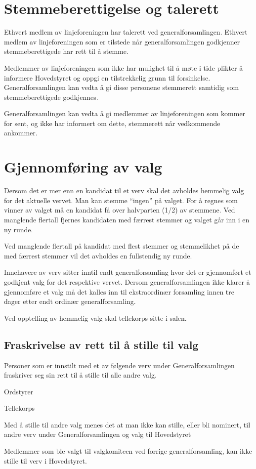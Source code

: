 \section{Stemmeberettigelse og talerett}
\vspace{23pt}
Ethvert medlem av linjeforeningen har talerett ved generalforsamlingen.
Ethvert medlem av linjeforeningen som er tilstede når generalforsamlingen godkjenner stemmeberettigede har rett til å stemme.\newline

Medlemmer av linjeforeningen som ikke har mulighet til å møte i tide plikter å informere Hovedstyret og oppgi en tilstrekkelig grunn til forsinkelse. Generalforsamlingen kan vedta å gi disse personene stemmerett samtidig som stemmeberettigede godkjennes.

Generalforsamlingen kan vedta å gi medlemmer av linjeforeningen som kommer for sent, og ikke har informert om dette, stemmerett når vedkommende ankommer.


\section{Gjennomføring av valg}{
\vspace{23pt}
Dersom det er mer enn en kandidat til et verv skal det avholdes hemmelig valg for det aktuelle vervet. Man kan stemme “ingen” på valget. For å regnes som vinner av valget må en kandidat få over halvparten (1/2) av stemmene. Ved manglende flertall fjernes kandidaten med færrest stemmer og valget går inn i en ny runde.\newline
					
Ved manglende flertall på kandidat med flest stemmer og stemmelikhet på de med færrest stemmer vil det avholdes en fullstendig ny runde.\newline

Innehavere av verv sitter inntil endt generalforsamling hvor det er gjennomført et godkjent valg for det respektive vervet. Dersom generalforsamlingen ikke klarer å gjennomføre et valg må det kalles inn til ekstraordinær forsamling innen tre dager etter endt ordinær generalforsamling.\newline

Ved opptelling av hemmelig valg skal tellekorps sitte i salen.


	\subsection{Fraskrivelse av rett til å stille til valg} {
	Personer som er innstilt med et av følgende verv under Generalforsamlingen fraskriver seg sin rett til å stille til alle andre valg.
	\begin{liste}
		\item Ordstyrer
		\item Tellekorps
	\end{liste}
	Med å stille til andre valg menes det at man ikke kan stille, eller bli nominert, til andre verv under Generalforsamlingen og valg til Hovedstyret \newline

    Medlemmer som ble valgt til valgkomiteen ved forrige generalforsamling, kan ikke stille til verv i Hovedstyret.

	}
}
